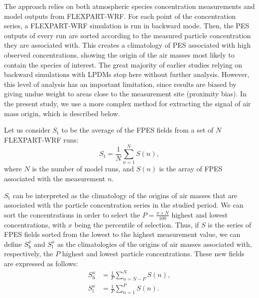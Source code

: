         The approach relies on both atmospheric species concentration measurements and model outputs from FLEXPART-WRF.
        For each point of the concentration series, a FLEXPART-WRF simulation is run in backward mode. Then, the PES outputs of every run are sorted according to the measured particle concentration they are associated with. This creates a climatology of PES associated with high observed concentrations, showing the origin of the air masses most likely to contain the species of interest.
        The great majority of earlier studies relying on backward simulations with LPDMs stop here without further analysis. However, this level of analysis has an important limitation, since results are biased by giving undue weight to areas close to the measurement site (proximity bias).
        In the present study, we use a more complex method for extracting the signal of air mass origin, which is described below.

        Let us consider $S_\text{t}$ to be the average of the FPES fields from a set of $N$ FLEXPART-WRF runs:
            \begin{equation}
                S_\text{t} = \frac{1}{N} \sum_{n=1}^{N}S(n),
            \end{equation}
            where $N$ is the number of model runs, and $S(n)$ is the array of FPES associated with the measurement $n$.

            $S_\text{t}$ can be interpreted as the climatology of the origins of air masses that are associated with the particle concentration series in the studied period.
            We can sort the concentrations in order to select the $P = \frac{x\times N}{100}$ highest and lowest concentrations, with $x$ being the percentile of selection.
            Thus, if $S$ is the series of FPES fields sorted from the lowest to the highest measurement value, we can define $S_\text{h}^{x}$ and $S_\text{l}^{x}$ as the climatologies of the origins of air masses associated with, respectively, the $P$ highest and lowest particle concentrations.
            These new fields are expressed as follows:
            \begin{align}
                S_\text{h}^{x} &= \frac{1}{P}\sum_{n = N-P}^{N}S(n),\\
                S_\text{l}^{x} &= \frac{1}{P}\sum_{n=1}^{P}S(n).
            \end{align}

